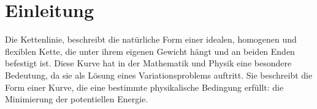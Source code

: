 %
%
%
%
\section{Einleitung\label{kettenlinie:section:Einleitung}}
Die Kettenlinie, beschreibt die natürliche Form einer idealen, homogenen und flexiblen Kette, die unter ihrem eigenen Gewicht hängt und an beiden Enden befestigt ist.
Diese Kurve hat in der Mathematik und Physik eine besondere Bedeutung, da sie als Lösung eines Variationsproblems auftritt.
Sie beschreibt die Form einer Kurve, die eine bestimmte physikalische Bedingung erfüllt: die Minimierung der potentiellen Energie. 

